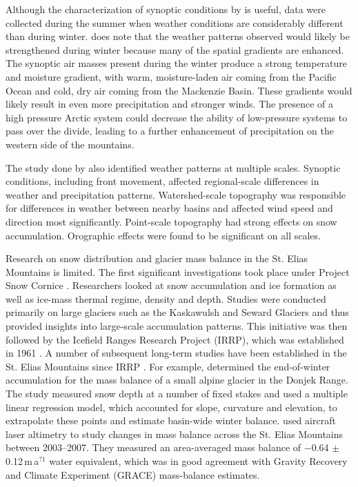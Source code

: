 \documentclass{sfuthesis}
\begin{document}
\begin{appendices}
Although the characterization of synoptic conditions by \cite{Taylor1969} is useful, data were collected during the summer when weather conditions are considerably different than during winter. \cite{Taylor1969} does note that the weather patterns observed would likely be strengthened during winter because many of the spatial gradients are enhanced. The synoptic air masses present during the winter produce a strong temperature and moisture gradient, with warm, moisture-laden air coming from the Pacific Ocean and cold, dry air coming from the Mackenzie Basin. These gradients would likely result in even more precipitation and stronger winds. The presence of a high pressure Arctic system could decrease the ability of low-pressure systems to pass over the divide, leading to a further enhancement of precipitation on the western side of the mountains. 

The study done by \cite{Taylor1969} also identified weather patterns at multiple scales. Synoptic conditions, including front movement, affected regional-scale differences in weather and precipitation patterns. Watershed-scale topography was responsible for differences in weather between nearby basins and affected wind speed and direction most significantly. Point-scale topography had strong effects on snow accumulation. Orographic effects were found to be significant on all scales. 

Research on snow distribution and glacier mass balance in the St. Elias Mountains is limited. The first significant investigations took place under Project Snow Cornice \citep{Wood1948}. Researchers looked at snow accumulation and ice formation as well as ice-mass thermal regime, density and depth. Studies were conducted primarily on large glaciers such as the Kaskawulsh and Seward Glaciers and thus provided insights into large-scale accumulation patterns. This initiative was then followed by the Icefield Ranges Research Project (IRRP), which was established in 1961 \citep{Danby2003}. A number of subsequent long-term studies have been established in the St. Elias Mountains since IRRP \citep[e.g.][]{Clarke1984, Paoli2009}. For example, \cite{Wheler2014} determined the end-of-winter accumulation for the mass balance of a small alpine glacier in the Donjek Range. The study measured snow depth at a number of fixed stakes and used a multiple linear regression model, which accounted for slope, curvature and elevation, to extrapolate these points and estimate basin-wide winter balance. \cite{Arendt2008} used aircraft laser altimetry to study changes in mass balance across the St. Elias Mountains between 2003--2007. They measured an area-averaged mass balance of $-$0.64 $\pm$ 0.12\,m\,a$^{?1}$ water equivalent, which was in good agreement with Gravity Recovery and Climate Experiment (GRACE) mass-balance estimates.


\end{appendices}
\end{document}
